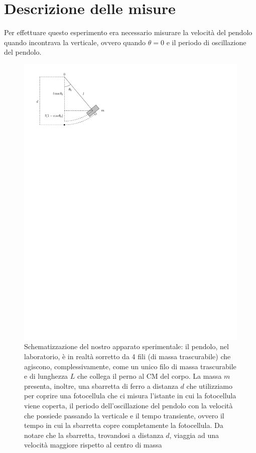 \documentclass{article}
\begin{document}
	\section{Descrizione delle misure}
	Per effettuare questo esperimento era necessario misurare la velocità del pendolo quando incontrava la verticale, ovvero quando $\theta = 0$ e il periodo di oscillazione del pendolo. 
	\begin{figure}[htbp]
		\centering
  		\includegraphics[scale=0.80]{pendolo_fisico_2.pdf}
  		\caption{Schematizzazione del nostro apparato sperimentale: il pendolo, nel laboratorio, è in realtà sorretto da 4 fili (di massa trascurabile) che agiscono, complessivamente, come un unico filo di massa trascurabile e di lunghezza $L$ che collega il perno al CM del corpo. La massa $m$ presenta, inoltre, una sbarretta di ferro a distanza $d$ che utilizziamo per coprire una fotocellula che ci misura l'istante in cui la fotocellula viene coperta, il periodo dell'oscillazione del pendolo con la velocità che possiede passando la verticale e il tempo transiente, ovvero il tempo in cui la sbarretta copre completamente la fotocellula. Da notare che la sbarretta, trovandosi a distanza $d$, viaggia ad una velocità maggiore rispetto al centro di massa}
  		\label{fig:pendolo}
	\end{figure}	
\end{document}
